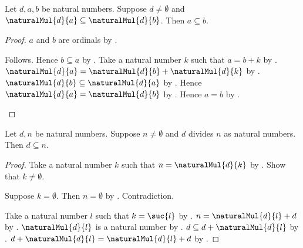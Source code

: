 \begin{theorem}\label{positive_multiplication_reflects_order}
    Let $d,a,b$ be natural numbers.
    Suppose $d\neq\emptyset$ and
        $\naturalMul{d}{a}\subseteq\naturalMul{d}{b}$.
    Then $a\subseteq b$.
\end{theorem}
\begin{proof}
    $a$ and $b$ are ordinals by .
    \begin{byCase}
            Follows.
            Hence $b\subseteq a$
                by .
            Take a natural number $k$ such that $a=b+k$
                by .
            $\naturalMul{d}{a}
                =\naturalMul{d}{b}+\naturalMul{d}{k}$
                by .
            $\naturalMul{d}{b}\subseteq\naturalMul{d}{a}$
                by .
            Hence $\naturalMul{d}{a}=\naturalMul{d}{b}$
                by .
            Hence $a=b$
                by .
    \end{byCase}
\end{proof}

\begin{proposition}\label{divisor_bounded_by_nonzero_dividend}
    Let $d,n$ be natural numbers.
    Suppose $n\neq\emptyset$ and
        $d$ divides $n$ as natural numbers.
    Then $d\subseteq n$.
\end{proposition}
\begin{proof}
    Take a natural number $k$ such that $n=\naturalMul{d}{k}$
        by .
    Show that $k\neq\emptyset$.
    \begin{subproof}
        Suppose $k=\emptyset$.
        Then $n=\emptyset$
            by .
        Contradiction.
    \end{subproof}
    Take a natural number $l$ such that $k=\suc{l}$
        by .
    $n=\naturalMul{d}{l}+d$
        by .
    $\naturalMul{d}{l}$ is a natural number
        by .
    $d\subseteq d+\naturalMul{d}{l}$
        by .
    $d+\naturalMul{d}{l}=\naturalMul{d}{l}+d$
        by .
\end{proof}

